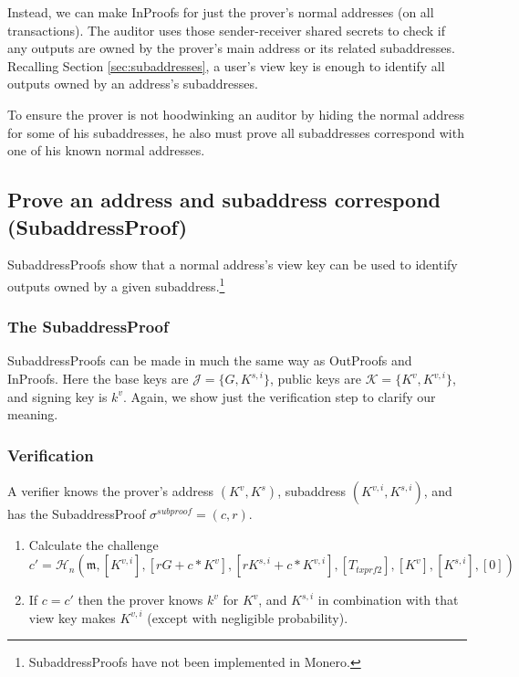 Instead, we can make InProofs for just the prover's normal addresses (on all transactions). The auditor uses those sender-receiver shared secrets to check if any outputs are owned by the prover's main address or its related subaddresses. Recalling Section \ref{sec:subaddresses}, a user's view key is enough to identify all outputs owned by an address's subaddresses.

To ensure the prover is not hoodwinking an auditor by hiding the normal address for some of his subaddresses, he also must prove all subaddresses correspond with one of his known normal addresses.


\subsection{Prove an address and subaddress correspond (SubaddressProof)}
\label{subsec:proofs-address-subaddress-correspond-subaddressproof}

SubaddressProofs show that a normal address's view key can be used to identify outputs owned by a given subaddress.\footnote{SubaddressProofs have not been implemented in Monero.}

\subsubsection*{The SubaddressProof}
SubaddressProofs can be made in much the same way as OutProofs and InProofs. Here the base keys are $\mathcal{J} = \{G, K^{s,i}\}$, public keys are $\mathcal{K} = \{K^v, K^{v,i}\}$, and signing key is $k^v$. Again, we show just the verification step to clarify our meaning.

\subsubsection*{Verification}

A verifier knows the prover's address $(K^v, K^s)$, subaddress $(K^{v,i}, K^{s,i})$, and has the SubaddressProof $\sigma^{subproof} = (c,r)$.

\begin{enumerate}
    \item Calculate the challenge\vspace{.175cm}
	\[c' = \mathcal{H}_n(\mathfrak{m},[K^{v,i}], [r G + c*K^v], [r K^{s,i} + c*K^{v,i}], [T_{txprf2}], [K^v], [K^{s,i}], [0])\]
    \item If $c = c'$ then the prover knows $k^v$ for $K^v$, and $K^{s,i}$ in combination with that view key makes $K^{v,i}$ (except with negligible probability).
\end{enumerate}{}


